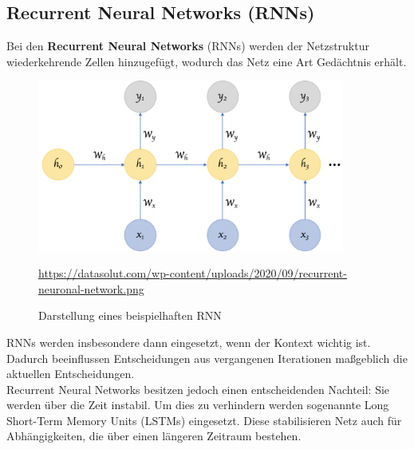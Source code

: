\subsection{Recurrent Neural Networks (RNNs)}

	Bei den \textbf{Recurrent Neural Networks} (RNNs) werden der Netzstruktur wiederkehrende Zellen hinzugefügt, wodurch das Netz eine Art  Gedächtnis erhält. \cite{datasolut4} \\ 
	
	\begin{figure}[H]
		\centering
		\includegraphics[width=0.9\textwidth]{kapitel3/images/rnn.png}
		\caption{Darstellung eines beispielhaften RNN}
		\vspace{0.2cm}
		\quelle\url{https://datasolut.com/wp-content/uploads/2020/09/recurrent-neuronal-network.png}
	\end{figure}
	
	
	RNNs werden insbesondere dann eingesetzt, wenn der Kontext wichtig ist. Dadurch beeinflussen Entscheidungen aus vergangenen Iterationen maßgeblich die aktuellen Entscheidungen. \cite{datasolut4} \\
	
	Recurrent Neural Networks besitzen jedoch einen entscheidenden Nachteil: Sie werden über die Zeit instabil. Um dies zu verhindern werden sogenannte Long Short-Term Memory Units (LSTMs) eingesetzt. Diese stabilisieren Netz auch für Abhängigkeiten, die über einen längeren Zeitraum bestehen. \cite{datasolut4}





